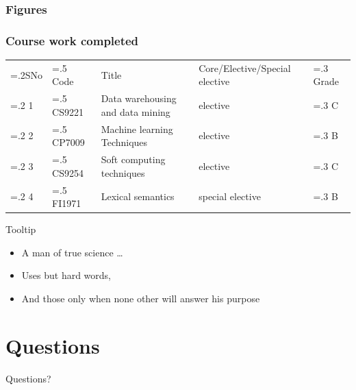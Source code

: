 \documentclass[11pt]{beamer}
\begin{document}
\begin{frame}
  \frametitle{Figures}
  \begin{minipage}{.45\linewidth}
    \begin{center}
      
    \end{center}
  \end{minipage}
  \begin{minipage}{.45\linewidth}
    \begin{center}
      
    \end{center}
  \end{minipage}

\end{frame}

\begin{frame}
  \frametitle{Course work completed}
  \small
  \begin{tabularx}{1.0\linewidth}{
      >{\hsize=.2\hsize}X
      >{\hsize=.5\hsize}X
      >{\hsize=2.4\hsize}X
      >{\hsize=1.6\hsize}X
      >{\hsize=.3\hsize}X} 
      \rowcolor{LightRed}SNo & Code & Title & Core/Elective/Special elective & Grade\\ 
      \rowcolor{LightBlue}   1 & CS9221 &  Data warehousing and data mining & elective & C\\
       \rowcolor{LightGreen}   2 & CP7009 & Machine learning Techniques & elective & B\\
      \rowcolor{LightBlue}   3 & CS9254 & Soft computing techniques & elective & C\\
      \rowcolor{LightGreen}   4 & FI1971 & Lexical semantics & special elective & B\\
  \end{tabularx}
\end{frame}

\begin{frame}{Tooltip}
  \begin{itemize}
  \item A man of true science \ldots
  \item Uses but  hard words,
  \item And those only when none other will answer his purpose
  \end{itemize}
\end{frame}
\section{Questions}
\begin{frame}{}
  \vfill
  \begin{center}
    Questions?
  \end{center}
  \vfill
  
\end{frame}
\end{document}
